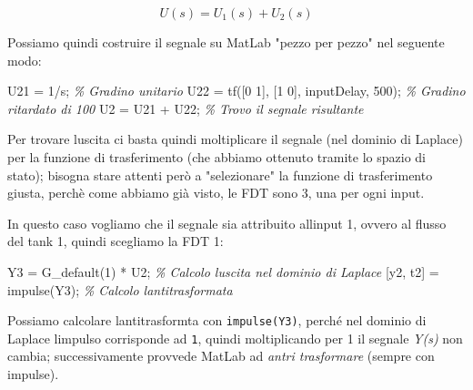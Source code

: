 \documentclass[
]{article}
\newenvironment{Shaded}{}{}
\newcommand{\CommentTok}[1]{\textcolor[rgb]{0.38,0.63,0.69}{\textit{#1}}}
\newcommand{\FloatTok}[1]{\textcolor[rgb]{0.25,0.63,0.44}{#1}}
\newcommand{\NormalTok}[1]{#1}
\newcommand{\OperatorTok}[1]{\textcolor[rgb]{0.40,0.40,0.40}{#1}}
\newcommand{\SpecialStringTok}[1]{\textcolor[rgb]{0.73,0.40,0.53}{#1}}
\newcommand{\VariableTok}[1]{\textcolor[rgb]{0.10,0.09,0.49}{#1}}
\begin{document}
\[U(s) = U_{1}(s) + U_{2}(s)\]

Possiamo quindi costruire il segnale su MatLab "pezzo per pezzo" nel
seguente modo:

\begin{Shaded}
\begin{Highlighting}[]
\VariableTok{U21} \OperatorTok{=} \FloatTok{1}\OperatorTok{/}\VariableTok{s}\OperatorTok{;}                                  \CommentTok{\% Gradino unitario}
\VariableTok{U22} \OperatorTok{=} \VariableTok{tf}\NormalTok{([}\FloatTok{0} \FloatTok{1}\NormalTok{]}\OperatorTok{,}\NormalTok{ [}\FloatTok{1} \FloatTok{0}\NormalTok{]}\OperatorTok{,} \SpecialStringTok{\textquotesingle{}inputDelay\textquotesingle{}}\OperatorTok{,} \FloatTok{500}\NormalTok{)}\OperatorTok{;}  \CommentTok{\% Gradino ritardato di 100}
\VariableTok{U2} \OperatorTok{=} \VariableTok{U21} \OperatorTok{+} \VariableTok{U22}\OperatorTok{;}                             \CommentTok{\% Trovo il segnale risultante}
\end{Highlighting}
\end{Shaded}

Per trovare l\textquotesingle uscita ci basta quindi moltiplicare il
segnale (nel dominio di Laplace) per la funzione di trasferimento (che
abbiamo ottenuto tramite lo spazio di stato); bisogna stare attenti però
a "selezionare" la funzione di trasferimento giusta, perchè come abbiamo
già visto, le FDT sono 3, una per ogni input.

In questo caso vogliamo che il segnale sia attribuito
all\textquotesingle input 1, ovvero al flusso del tank 1, quindi
scegliamo la FDT 1:

\begin{Shaded}
\begin{Highlighting}[]
\VariableTok{Y3} \OperatorTok{=} \VariableTok{G\_default}\NormalTok{(}\FloatTok{1}\NormalTok{) }\OperatorTok{*} \VariableTok{U2}\OperatorTok{;}			\CommentTok{\% Calcolo l\textquotesingle{}uscita nel dominio di Laplace}
\NormalTok{[}\VariableTok{y2}\OperatorTok{,} \VariableTok{t2}\NormalTok{] }\OperatorTok{=} \VariableTok{impulse}\NormalTok{(}\VariableTok{Y3}\NormalTok{)}\OperatorTok{;}			\CommentTok{\% Calcolo l\textquotesingle{}antitrasformata}
\end{Highlighting}
\end{Shaded}

Possiamo calcolare l\textquotesingle antitrasformta con
\texttt{impulse(Y3)}, perché nel dominio di Laplace
l\textquotesingle impulso corrisponde ad \texttt{1}, quindi
moltiplicando per 1 il segnale \emph{Y(s)} non cambia; successivamente
provvede MatLab ad \emph{antri trasformare} (sempre con impulse).
\end{document}
